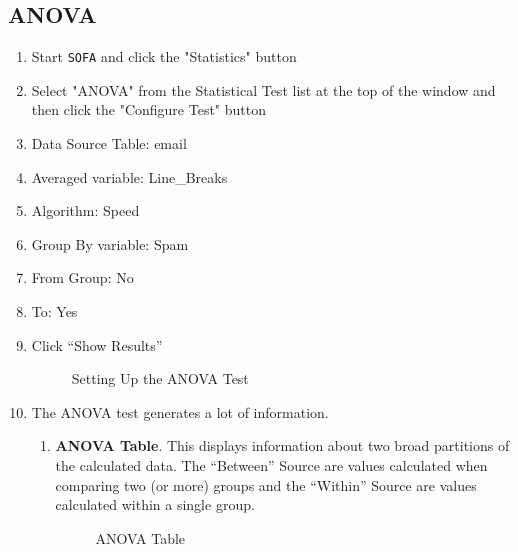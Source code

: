 \subsection{ANOVA}

\begin{enumerate}
  \item Start \texttt{SOFA} and click the "Statistics" button
  \item Select "ANOVA" from the Statistical Test list at the top of the window and then click the "Configure Test" button
  \item Data Source Table: email
  \item Averaged variable: Line\_Breaks
  \item Algorithm: Speed 
  \item Group By variable: Spam
  \item From Group: No
  \item To: Yes
  \item Click ``Show Results''
  
  \begin{figure}[H]
    \begin{center}
      \caption{Setting Up the ANOVA Test}
    \end{center}
  \end{figure}
  
  \item The ANOVA test generates a lot of information.
  
  \begin{enumerate}
    \item \textbf{ANOVA Table}. This displays information about two broad partitions of the calculated data. The ``Between'' Source are values calculated when comparing two (or more) groups and the ``Within'' Source are values calculated within a single group. 

    \begin{figure}[H]
      \begin{center}
        \caption{ANOVA Table}
      \end{center}
    \end{figure}
  

\end{enumerate}
\end{enumerate}
